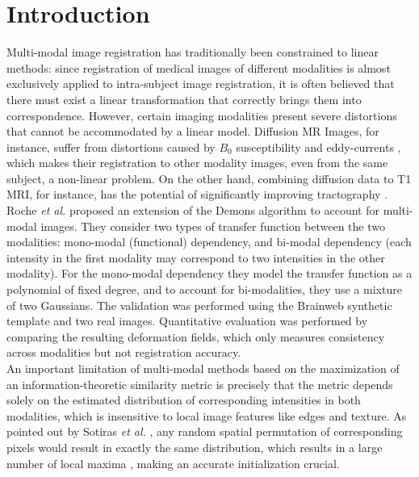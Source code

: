 \section{Introduction}

Multi-modal image registration has traditionally been constrained to linear methods: since registration of medical images of different modalities is almost exclusively
applied to intra-subject image registration, it is often believed that there must exist a linear transformation that correctly brings them into correspondence. However,
certain imaging modalities present severe distortions that cannot be accommodated by a linear model. Diffusion MR Images, for instance, suffer from distortions caused by
$B_{0}$ susceptibility and eddy-currents \cite{Tournier2011}\cite{Andersson2003}, which makes their registration to other modality images, even from the same subject,
a non-linear problem. On the other hand, combining diffusion data to T1 MRI, for instance, has the potential of significantly improving tractography \cite{Smith2012}.\\

Roche {\it et al.} \cite{Roche2004a} proposed an extension of the Demons algorithm to account for multi-modal images. They consider two types of transfer function between the two
modalities: mono-modal (functional) dependency, and bi-modal dependency (each intensity in the first modality may correspond to two intensities in the other modality).
For the mono-modal dependency they model the transfer function as a polynomial of fixed degree, and to account for bi-modalities, they use a mixture of two Gaussians.
The validation was performed using the Brainweb synthetic template \cite{Cocosco1997}\cite{Kwan1999} and two real images. Quantitative evaluation was performed by comparing
the resulting deformation fields, which only measures consistency across modalities but not registration accuracy.\\

An important limitation of multi-modal methods based on the maximization of an information-theoretic similarity metric is precisely that the
metric depends solely on the estimated distribution of corresponding intensities in both modalities, which is insensitive to local image
features like edges and texture. As pointed out by Sotiras {\it et al.} \cite{Sotiras2013}, any random spatial permutation of corresponding pixels would
result in exactly the same distribution, which results in a large number of local maxima \cite{Roche1998}, making an accurate initialization crucial.\\

